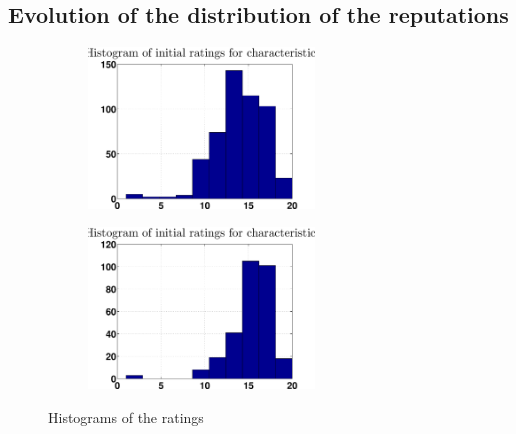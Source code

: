 \documentclass[12pt,a4paper]{article}
\begin{document}
\subsection*{Evolution of the distribution of the reputations}
\begin{figure}
\centering
\begin{subfigure}[b]{0.48\textwidth}
\includegraphics[width = 6cm]{noPreprocess/ratingsHistK10c1.eps}
\end{subfigure}
\begin{subfigure}[b]{0.48\textwidth}
\includegraphics[width = 6cm]{noPreprocess/ratingsHistK10c2.eps}
\end{subfigure}
\caption{Histograms of the ratings}
\end{figure}
\end{document}
